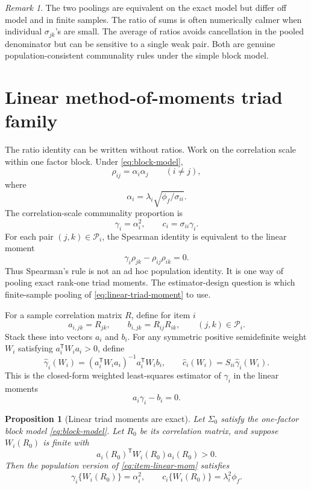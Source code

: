 \documentclass[11pt]{article}
\newcommand{\T}{^{\mathsf T}}
\theoremstyle{plain}
\newtheorem{proposition}{Proposition}
\theoremstyle{remark}
\newtheorem*{remark}{Remark}
\begin{document}
\begin{remark}
The two poolings are equivalent on the exact model but differ off model and in
finite samples. The ratio of sums is often numerically calmer when individual
\(\sigma_{jk}\)'s are small. The average of ratios avoids cancellation in the
pooled denominator but can be sensitive to a single weak pair. Both are genuine
population-consistent communality rules under the simple block model.
\end{remark}

\section{Linear method-of-moments triad family}

The ratio identity can be written without ratios. Work on the correlation
scale within one factor block. Under \eqref{eq:block-model},
\[
  \rho_{ij}=\alpha_i\alpha_j\qquad(i\ne j),
\]
where
\[
  \alpha_i=\lambda_i\sqrt{\phi_f/\sigma_{ii}} .
\]
The correlation-scale communality proportion is
\[
  \gamma_i=\alpha_i^2,
  \qquad
  c_i=\sigma_{ii}\gamma_i .
\]
For each pair \((j,k)\in\mathcal P_i\), the Spearman identity is equivalent to
the linear moment
\begin{equation}\label{eq:linear-triad-moment}
  \gamma_i\rho_{jk}-\rho_{ij}\rho_{ik}=0 .
\end{equation}
Thus Spearman's rule is not an ad hoc population identity. It is one way of
pooling exact rank-one triad moments. The estimator-design question is which
finite-sample pooling of \eqref{eq:linear-triad-moment} to use.

For a sample correlation matrix \(R\), define for item \(i\)
\[
  a_{i,jk}=R_{jk},
  \qquad
  b_{i,jk}=R_{ij}R_{ik},
  \qquad
  (j,k)\in\mathcal P_i .
\]
Stack these into vectors \(a_i\) and \(b_i\). For any symmetric positive
semidefinite weight \(W_i\) satisfying \(a_i\T W_i a_i>0\), define
\begin{equation}\label{eq:item-linear-mom}
  \hat\gamma_i(W_i)
  =
  (a_i\T W_i a_i)^{-1}a_i\T W_i b_i,
  \qquad
  \hat c_i(W_i)=S_{ii}\hat\gamma_i(W_i).
\end{equation}
This is the closed-form weighted least-squares estimator of \(\gamma_i\) in
the linear moments
\[
  a_i\gamma_i-b_i=0 .
\]

\begin{proposition}[Linear triad moments are exact]\label{prop:linear-mom}
Let \(\Sigma_0\) satisfy the one-factor block model
\eqref{eq:block-model}. Let \(R_0\) be its correlation matrix, and suppose
\(W_i(R_0)\) is finite with
\[
  a_i(R_0)\T W_i(R_0)a_i(R_0)>0 .
\]
Then the population version of \eqref{eq:item-linear-mom} satisfies
\[
  \gamma_i\{W_i(R_0)\}=\alpha_i^2,
  \qquad
  c_i\{W_i(R_0)\}=\lambda_i^2\phi_f .
\]
\end{proposition}
\end{document}
